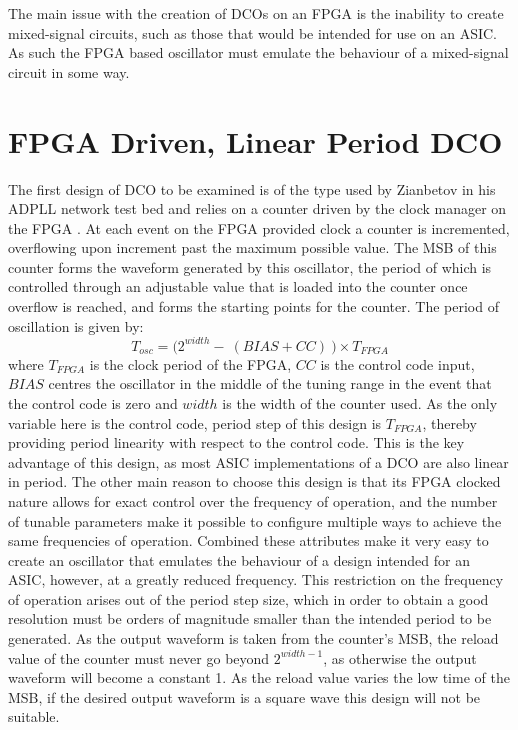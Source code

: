 The main issue with the creation of \ac{DCO}s on an \ac{FPGA} is the inability to create mixed-signal circuits, such as those that would be intended for use on an \ac{ASIC}. As such the \ac{FPGA} based oscillator must emulate the behaviour of a mixed-signal circuit in some way.

\section{\acs{FPGA} Driven, Linear Period \acs{DCO}}
The first design of \ac{DCO} to be examined is of the type used by Zianbetov in his \ac{ADPLL} network test bed and relies on a counter driven by the clock manager on the \ac{FPGA} \cite{zianbetov2013phd}. At each event on the \ac{FPGA} provided clock a counter is incremented, overflowing upon increment past the maximum possible value. The \ac{MSB} of this counter forms the waveform generated by this oscillator, the period of which is controlled through an adjustable value that is loaded into the counter once overflow is reached, and forms the starting points for the counter. The period of oscillation is given by:
\begin{equation}
	T_{osc} = \big(2^{width} -~(BIAS+CC)~\big)\times T_{FPGA}
\end{equation}
where $T_{FPGA}$ is the clock period of the \ac{FPGA}, $CC$ is the control code input, $BIAS$ centres the oscillator in the middle of the tuning range in the event that the control code is zero and $width$ is the width of the counter used. As the only variable here is the control code, period step of this design is $T_{FPGA}$, thereby providing period linearity with respect to the control code. This is the key advantage of this design, as most \ac{ASIC} implementations of a \ac{DCO} are also linear in period. The other main reason to choose this design is that its \ac{FPGA} clocked nature allows for exact control over the frequency of operation, and the number of tunable parameters make it possible to configure multiple ways to achieve the same frequencies of operation. Combined these attributes make it very easy to create an oscillator that emulates the behaviour of a design intended for an \ac{ASIC}, however, at a greatly reduced frequency. This restriction on the frequency of operation arises out of the period step size, which in order to obtain a good resolution must be orders of magnitude smaller than the intended period to be generated. As the output waveform is taken from the counter's \ac{MSB}, the reload value of the counter must never go beyond $2^{width-1}$, as otherwise the output waveform will become a constant 1. As the reload value varies the low time of the \ac{MSB}, if the desired output waveform is a square wave this design will not be suitable.

